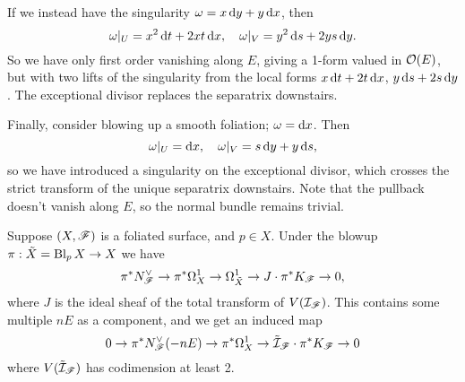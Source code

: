 \begin{example}
    If we instead have the singularity $\omega=x\d y+y\d x$, then
    \begin{equation*}
        \omega|_U = x^2\d t + 2xt\d x, \quad
        \omega|_V = y^2\d s+2ys\d y.
    \end{equation*}
    So we have only first order vanishing along $E$, giving a 1-form valued in
    $\mathcal{O}(E)$, but with two lifts of the singularity from the local forms
    $x\d t+2t\d x$, $y\d s+2s\d y$. The exceptional divisor replaces the
    separatrix downstairs.
\end{example}

\begin{example}
    Finally, consider blowing up a smooth foliation; $\omega=\d x$. Then
    \begin{equation*}
        \omega|_U = \d x, \quad \omega|_V = s\d y+y\d s,
    \end{equation*}
    so we have introduced a singularity on the exceptional divisor, which
    crosses the strict transform of the unique separatrix downstairs. Note that
    the pullback doesn't vanish along $E$, so the normal bundle remains trivial.
\end{example}

\begin{proposition}
    Suppose $(X,\mathscr{F})$ is a foliated surface, and $p\in X$. Under the blowup
    $\pi:\tilde X=\operatorname{Bl}_pX\to X$ we have
    \begin{equation*}
        \pi^*N_{\mathscr{F}}^\vee\to\pi^*\Omega^1_X\to\Omega^1_{\tilde X}
            \to J\cdot\pi^*K_{\mathscr{F}} \to 0,
    \end{equation*}
    where $J$ is the ideal sheaf of the total transform of $V(\mathcal{I}_{\mathscr{F}})$.
    This contains some multiple $nE$ as a component, and we get an induced map
    \begin{equation*}
        0\to \pi^*N_{\mathscr{F}}^\vee(-nE) \to \pi^*\Omega^1_X
            \to \tilde{\mathcal{I}}_{\mathscr{F}}\cdot\pi^*K_{\mathscr{F}} \to 0
    \end{equation*}
    where $V(\tilde{\mathcal{I}}_{\mathscr{F}})$ has codimension at least 2.
\end{proposition}
